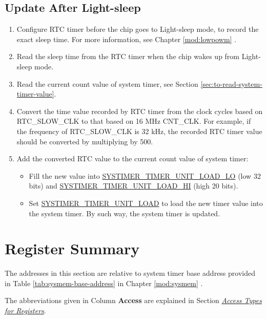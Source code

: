 \documentclass[main\_\_EN.tex]{subfiles}
\begin{document}
\subsection{Update After Light-sleep}
\begin{enumerate}
    \item Configure RTC timer before the chip goes to Light-sleep mode, to record the exact sleep time. For more information, see Chapter \ref{mod:lowpowm} \textit{}.
    \item Read the sleep time from the RTC timer when the chip wakes up from Light-sleep mode.
    \item Read the current count value of system timer, see Section \ref{sec:to-read-system-timer-value}.
    \item Convert the time value recorded by RTC timer from the clock cycles based on RTC\_SLOW\_CLK to that based on 16 MHz CNT\_CLK. For example, if the frequency of RTC\_SLOW\_CLK is 32 kHz, the recorded RTC timer value should be converted by multiplying by 500.
    \item Add the converted RTC value to the current count value of system timer:
    \begin{itemize}
        \item Fill the new value into \hyperref[fielddesc:SYSTIMERTIMERUNIT0LOADLO]{SYSTIMER\_TIMER\_UNIT\_LOAD\_LO} (low 32 bits) and \hyperref[fielddesc:SYSTIMERTIMERUNIT0LOADHI]{SYSTIMER\_TIMER\_UNIT\_LOAD\_HI} (high 20 bits).
        \item Set \hyperref[fielddesc:SYSTIMERTIMERUNIT0LOAD]{SYSTIMER\_TIMER\_UNIT\_LOAD} to load the new timer value into the system timer. By such way, the system timer is updated.    \end{itemize}
\end{enumerate}



\clearpage
\hypertarget{systimer-summ}{}
\section{Register Summary}
\label{sec:systimer-reg-summ}

The addresses in this section are relative to system timer base address provided in Table \ref{tab:sysmem-base-address} in Chapter \ref{mod:sysmem} \textit{}.

The abbreviations given in Column \textbf{Access} are explained in Section \hyperref[glossary-access-types]{\textit{Access Types for Registers}}.
\end{document}
